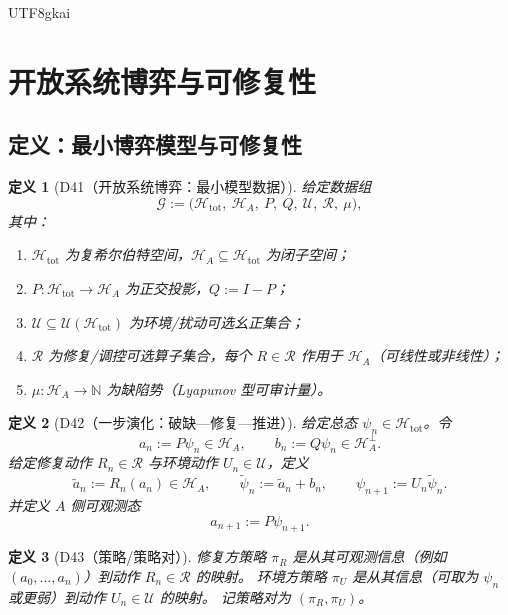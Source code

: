 \documentclass[12pt]{article}
\newtheorem{definition}{定义}[section]
\begin{document}
\begin{CJK*}{UTF8}{gkai}
\clearpage
\section{开放系统博弈与可修复性}
\label{sec:open-game-repairability}

\subsection{定义：最小博弈模型与可修复性}

\begin{definition}[D41（开放系统博弈：最小模型数据）]
\label{def:D41}
给定数据组
\[
\mathcal G:=
\big(\mathcal H_{\mathrm{tot}},\ \mathcal H_A,\ P,\ Q,\ \mathcal U,\ \mathcal R,\ \mu\big),
\]
其中：
\begin{enumerate}
\item $\mathcal H_{\mathrm{tot}}$ 为复希尔伯特空间，$\mathcal H_A\subseteq\mathcal H_{\mathrm{tot}}$ 为闭子空间；
\item $P:\mathcal H_{\mathrm{tot}}\to\mathcal H_A$ 为正交投影，$Q:=I-P$；
\item $\mathcal U\subseteq\mathcal U(\mathcal H_{\mathrm{tot}})$ 为环境/扰动可选幺正集合；
\item $\mathcal R$ 为修复/调控可选算子集合，每个 $R\in\mathcal R$ 作用于 $\mathcal H_A$（可线性或非线性）；
\item $\mu:\mathcal H_A\to\mathbb N$ 为缺陷势（Lyapunov 型可审计量）。
\end{enumerate}
\end{definition}

\begin{definition}[D42（一步演化：破缺—修复—推进）]
\label{def:D42}
给定总态 $\psi_n\in\mathcal H_{\mathrm{tot}}$。令
\[
a_n:=P\psi_n\in\mathcal H_A,\qquad b_n:=Q\psi_n\in\mathcal H_A^\perp.
\]
给定修复动作 $R_n\in\mathcal R$ 与环境动作 $U_n\in\mathcal U$，定义
\[
\tilde a_n:=R_n(a_n)\in\mathcal H_A,\qquad
\tilde\psi_n:=\tilde a_n+b_n,
\qquad
\psi_{n+1}:=U_n\tilde\psi_n.
\]
并定义 $A$ 侧可观测态
\[
a_{n+1}:=P\psi_{n+1}.
\]
\end{definition}

\begin{definition}[D43（策略/策略对）]
\label{def:D43}
修复方策略 $\pi_R$ 是从其可观测信息（例如 $(a_0,\dots,a_n)$）到动作 $R_n\in\mathcal R$ 的映射。
环境方策略 $\pi_U$ 是从其信息（可取为 $\psi_n$ 或更弱）到动作 $U_n\in\mathcal U$ 的映射。
记策略对为 $(\pi_R,\pi_U)$。
\end{definition}


\end{CJK*}
\end{document}
